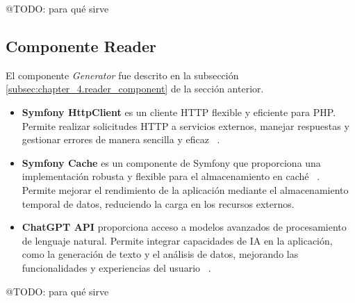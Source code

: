 \colorbox{color_highlight}{@TODO: para qué sirve}

\subsection*{Componente Reader}

El componente \textit{Generator} fue descrito en la subsección \ref{subsec:chapter_4.reader_component}
de la sección anterior.

\begin{itemize}
    \item \textbf{Symfony HttpClient} es un cliente HTTP flexible y eficiente para PHP. Permite realizar solicitudes
    HTTP a servicios externos, manejar respuestas y gestionar errores de manera sencilla y eficaz
    ~\cite{https://symfony.com/doc/current/http_client.html}.
    \item \textbf{Symfony Cache} es un componente de Symfony que proporciona una implementación robusta y flexible
    para el almacenamiento en caché ~\cite{https://symfony.com/doc/current/components/cache.html}.
    Permite mejorar el rendimiento de la aplicación mediante el almacenamiento temporal de datos, reduciendo la carga en
    los recursos externos.
    \item \textbf{ChatGPT API} proporciona acceso a modelos avanzados de procesamiento de lenguaje natural.
    Permite integrar capacidades de IA en la aplicación, como la generación de texto y el análisis de datos, mejorando
    las funcionalidades y experiencias del usuario ~\cite{https://platform.openai.com/docs/api-reference/chat}.
\end{itemize}

\colorbox{color_highlight}{@TODO: para qué sirve}



